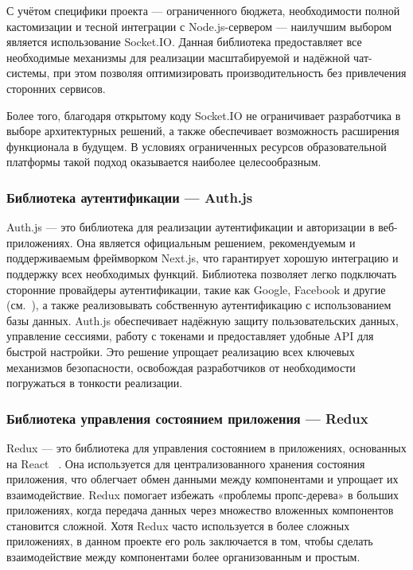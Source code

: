 С учётом специфики проекта — ограниченного бюджета, необходимости полной кастомизации и тесной интеграции с Node.js-сервером — наилучшим выбором является использование Socket.IO. Данная библиотека предоставляет все необходимые механизмы для реализации масштабируемой и надёжной чат-системы, при этом позволяя оптимизировать производительность без привлечения сторонних сервисов.

Более того, благодаря открытому коду Socket.IO не ограничивает разработчика в выборе архитектурных решений, а также обеспечивает возможность расширения функционала в будущем. В условиях ограниченных ресурсов образовательной платформы такой подход оказывается наиболее целесообразным.

\subsubsection*{Библиотека аутентификации — Auth.js}

Auth.js — это библиотека для реализации аутентификации и авторизации в веб-приложениях. Она является официальным решением, рекомендуемым и поддерживаемым фреймворком Next.js, что гарантирует хорошую интеграцию и поддержку всех необходимых функций. Библиотека позволяет легко подключать сторонние провайдеры аутентификации, такие как Google, Facebook и другие (см.~\cite{nextauth_docs}), а также реализовывать собственную аутентификацию с использованием базы данных. Auth.js обеспечивает надёжную защиту пользовательских данных, управление сессиями, работу с токенами и предоставляет удобные API для быстрой настройки. Это решение упрощает реализацию всех ключевых механизмов безопасности, освобождая разработчиков от необходимости погружаться в тонкости реализации.  

\subsubsection*{Библиотека управления состоянием приложения — Redux}

Redux — это библиотека для управления состоянием в приложениях, основанных на React ~\cite{redux_docs}. Она используется для централизованного хранения состояния приложения, что облегчает обмен данными между компонентами и упрощает их взаимодействие. Redux помогает избежать «проблемы пропс-дерева» в больших приложениях, когда передача данных через множество вложенных компонентов становится сложной. Хотя Redux часто используется в более сложных приложениях, в данном проекте его роль заключается в том, чтобы сделать взаимодействие между компонентами более организованным и простым.

